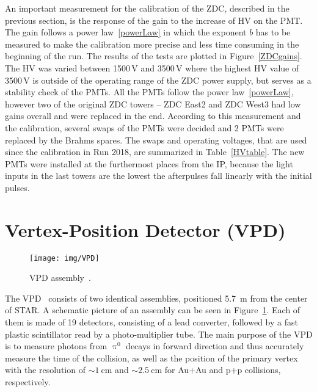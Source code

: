An important measurement for the calibration of the ZDC, described in the previous section, is the response of the gain to the increase of HV on the PMT\@. The gain follows a power law~\eqref{powerLaw} in which the exponent $b$ has to be measured to make the calibration more precise and less time consuming in the beginning of the run. The results of the tests are plotted in Figure~\ref{ZDCgains}\@. The HV was varied between 1500$\,$V and 3500$\,$V where the highest HV value of 3500$\,$V is outside of the operating range of the ZDC power supply, but serves as a stability check of the PMTs. All the PMTs follow the power law~\eqref{powerLaw}, however two of the original ZDC towers -- ZDC East2 and ZDC West3 had low gains overall and were replaced in the end. According to this measurement and the calibration, several swaps of the PMTs were decided and 2 PMTs were replaced by the Brahms spares. The swaps and operating voltages, that are used since the calibration in Run 2018, are summarized in Table~\ref{HVtable}\@. The new PMTs were installed at the furthermost places from the IP, because the light inputs in the last towers are the lowest the afterpulses fall linearly with the initial pulses. 






\section{Vertex-Position Detector (VPD)\label{VPD}}

\begin{figure}[!htb]
\begin{center}
 \texttt{[image: img/VPD]}\\
\end{center}
\caption{\label{VPDassembly}VPD assembly~\cite{VPD}.}
\end{figure}

The VPD~\cite{VPD} consists of two identical assemblies, positioned \SI{5.7}{\metre} from the center of STAR\@. A schematic 
picture of an assembly can be seen in Figure~\ref{VPDassembly}. Each of them is made of 19 detectors, consisting of a lead 
converter, followed by a fast plastic scintillator read by a photo-multiplier tube. The main purpose of the VPD is to measure 
photons from $\uppi^0$ decays in forward direction and thus accurately measure the time of the collision, as well as 
the position of the primary vertex with the resolution of $\sim \SI{1}{\centi\metre}$ and  $\sim \SI{2.5}{\centi\metre}$ 
for Au+Au and p+p collisions, respectively.


